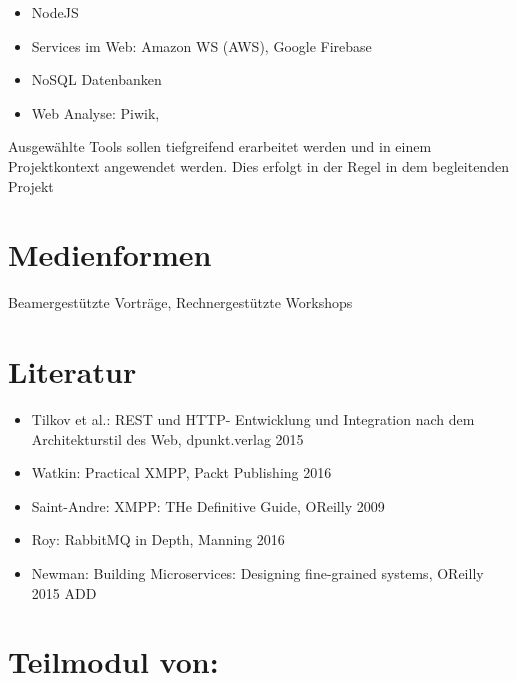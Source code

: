 \begin{itemize}
\tightlist
\item
  NodeJS
\item
  Services im Web: Amazon WS (AWS), Google Firebase
\item
  NoSQL Datenbanken
\item
  Web Analyse: Piwik,
\end{itemize}

Ausgewählte Tools sollen tiefgreifend erarbeitet werden und in einem
Projektkontext angewendet werden. Dies erfolgt in der Regel in dem
begleitenden Projekt

\hypertarget{medienformenpathlabelmi-2017modulbeschreibungen-bachelorba_wd_frameworks-daten-und-dienste}{%
\section*{Medienformen\label{/mi-2017/modulbeschreibungen-bachelor/BA_WD_Frameworks-daten-und-dienste}}\label{medienformenpathlabelmi-2017modulbeschreibungen-bachelorba_wd_frameworks-daten-und-dienste}}

Beamergestützte Vorträge, Rechnergestützte Workshops

\hypertarget{literaturpathlabelmi-2017modulbeschreibungen-bachelorba_wd_frameworks-daten-und-dienste}{%
\section*{Literatur\label{/mi-2017/modulbeschreibungen-bachelor/BA_WD_Frameworks-daten-und-dienste}}\label{literaturpathlabelmi-2017modulbeschreibungen-bachelorba_wd_frameworks-daten-und-dienste}}

\begin{itemize}
\tightlist
\item
  Tilkov et al.: REST und HTTP- Entwicklung und Integration nach dem
  Architekturstil des Web, dpunkt.verlag 2015
\item
  Watkin: Practical XMPP, Packt Publishing 2016
\item
  Saint-Andre: XMPP: THe Definitive Guide, OReilly 2009
\item
  Roy: RabbitMQ in Depth, Manning 2016
\item
  Newman: Building Microservices: Designing fine-grained systems,
  OReilly 2015 ADD
\end{itemize}

\hypertarget{teilmodul-vonpathlabelmi-2017modulbeschreibungen-bachelorba_wd_frameworks-daten-und-dienste}{%
\section*{Teilmodul
von:\label{/mi-2017/modulbeschreibungen-bachelor/BA_WD_Frameworks-daten-und-dienste}}\label{teilmodul-vonpathlabelmi-2017modulbeschreibungen-bachelorba_wd_frameworks-daten-und-dienste}}


